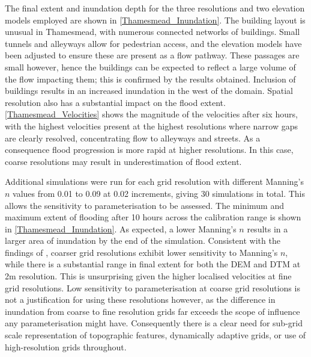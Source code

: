 \documentclass[11pt,english,a4paper]{article}
\begin{document}
The final extent and inundation depth for the three resolutions and two elevation models employed are shown in \ref{Thamesmead_Inundation}. The building layout is unusual in Thamesmead, with numerous connected networks of buildings. Small tunnels and alleyways allow for pedestrian access, and the elevation models have been adjusted to ensure these are present as a flow pathway. These passages are small however, hence the buildings can be expected to reflect a large volume of the flow impacting them; this is confirmed by the results obtained. Inclusion of buildings results in an increased inundation in the west of the domain. Spatial resolution also has a substantial impact on the flood extent. \ref{Thamesmead_Velocities} shows the magnitude of the velocities after six hours, with the highest velocities present at the highest resolutions where narrow gaps are clearly resolved, concentrating flow to alleyways and streets. As a consequence flood progression is more rapid at higher resolutions. In this case, coarse resolutions may result in underestimation of flood extent.

Additional simulations were run for each grid resolution with different Manning's $n$ values from 0.01 to 0.09 at 0.02 increments, giving 30 simulations in total. This allows the sensitivity to parameterisation to be assessed. The minimum and maximum extent of flooding after 10 hours across the calibration range is shown in \ref{Thamesmead_Inundation}. As expected, a lower Manning's $n$ results in a larger area of inundation by the end of the simulation. Consistent with the findings of \citet{Yu2006}, coarser grid resolutions exhibit lower sensitivity to Manning's $n$, while there is a substantial range in final extent for both the DEM and DTM at 2m resolution. This is unsurprising given the higher localised velocities at fine grid resolutions. Low sensitivity to parameterisation at coarse grid resolutions is not a justification for using these resolutions however, as the difference in inundation from coarse to fine resolution grids far exceeds the scope of influence any parameterisation might have. Consequently there is a clear need for sub-grid scale representation of topographic features, dynamically adaptive grids, or use of high-resolution grids throughout. 
\end{document}
